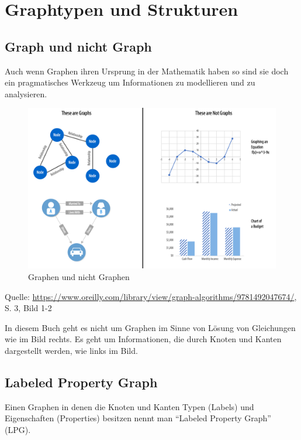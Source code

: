 \documentclass[ngerman,]{scrreprt}
\begin{document}
\section{Graphtypen und Strukturen}\label{graphtypen-und-strukturen}

\subsection{Graph und nicht Graph}\label{graph-und-nicht-graph}

Auch wenn Graphen ihren Ursprung in der Mathematik haben so sind sie doch ein pragmatisches Werkzeug um Informationen zu modellieren und zu analysieren.

\begin{figure}
\centering
\includegraphics{Bilder/GraphsNotGraphs.png}
\caption{Graphen und nicht Graphen}
\end{figure}

Quelle: \href{Needham/Hodler\%202019}{https://www.oreilly.com/library/view/graph-algorithms/9781492047674/}, S. 3, Bild 1-2

In diesem Buch geht es nicht um Graphen im Sinne von Lösung von Gleichungen wie im Bild rechts. Es geht um Informationen, die durch Knoten und Kanten dargestellt werden, wie links im Bild.

\subsection{Labeled Property Graph}\label{labeled-property-graph}

Einen Graphen in denen die Knoten und Kanten Typen (Labels) und Eigenschaften (Properties) besitzen nennt man ``Labeled Property Graph'' (LPG).
\end{document}
